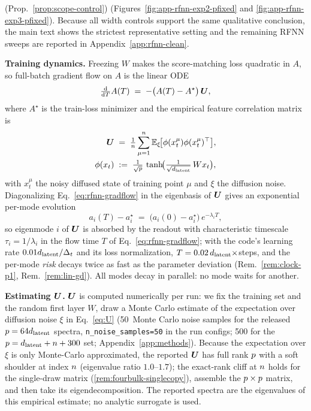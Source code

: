 (Prop.~\ref{prop:scope-control}) (Figures~\ref{fig:app-rfnn-exp2-pfixed} and \ref{fig:app-rfnn-exp3-pfixed}). Because all width controls support the same qualitative conclusion, the main text shows the strictest representative setting and the remaining RFNN sweeps are reported in Appendix~\ref{app:rfnn-clean}.

\textbf{Training dynamics.}
Freezing $W$ makes the score-matching loss quadratic in $A$, so full-batch gradient flow on $A$ is the linear ODE
\begin{equation}
  \tfrac{\mathrm{d}}{\mathrm{d} T} A(T) \;=\; -\bigl(A(T) - A^{\star}\bigr)\,\bm{U},
  \label{eq:rfnn-gradflow}
\end{equation}
where $A^\star$ is the train-loss minimizer and the empirical feature correlation matrix is
\begin{align}
  \bm{U} \;&=\; \tfrac{1}{n}\sum_{\mu=1}^{n}
    \mathbb{E}_{\xi}\!\bigl[\phi(x_t^{\mu})\phi(x_t^{\mu})^{\top}\bigr],
  \label{eq:U} \\
  \phi(x_t) \;&:=\; \tfrac{1}{\sqrt{p}}\,
    \tanh\!\bigl(\tfrac{1}{\sqrt{d_{\mathrm{latent}}}}\, W x_t\bigr),
\end{align}
with $x_t^\mu$ the noisy diffused state of training point $\mu$ and $\xi$ the diffusion noise. Diagonalizing Eq.~\eqref{eq:rfnn-gradflow} in the eigenbasis of $\bm{U}$ gives an exponential per-mode evolution
\begin{equation}
  a_i(T) - a_i^{\star} \;=\; \bigl(a_i(0) - a_i^{\star}\bigr)\,
    e^{-\lambda_i T},
  \label{eq:rfnn-mode-decay}
\end{equation}
so eigenmode $i$ of $\bm{U}$ is absorbed by the readout with characteristic timescale $\tau_i=1/\lambda_i$ in the flow time $T$ of Eq.~\eqref{eq:rfnn-gradflow}; with the code's learning rate $0.01d_{\mathrm{latent}}/\Delta_t$ and its loss normalization, $T=0.02\,d_{\mathrm{latent}}\times$steps, and the per-mode \emph{risk} decays twice as fast as the parameter deviation (Rem.~\ref{rem:clock-p1}, Rem.~\ref{rem:lin-gd}). All modes decay in parallel: no mode waits for another.

\textbf{Estimating $\bm{U}$.}
$\bm{U}$ is computed numerically per run: we fix the training set and the random first layer $W$, draw a Monte Carlo estimate of the expectation over diffusion noise $\xi$ in Eq.~\eqref{eq:U} (50~Monte Carlo noise samples for the released $p=64d_{\mathrm{latent}}$ spectra, \texttt{n\_noise\_samples=50} in the run configs; 500 for the $p=d_{\mathrm{latent}}+n+300$ set; Appendix~\ref{app:methods}). Because the expectation over $\xi$ is only Monte-Carlo approximated, the reported $\bm{U}$ has full rank $p$ with a soft shoulder at index $n$ (eigenvalue ratio $1.0$--$1.7$); the exact-rank cliff at $n$ holds for the single-draw matrix (\cref{rem:fourbulk-singlecopy}), assemble the $p \times p$ matrix, and then take its eigendecomposition. The reported spectra are the eigenvalues of this empirical estimate; no analytic surrogate is used.


